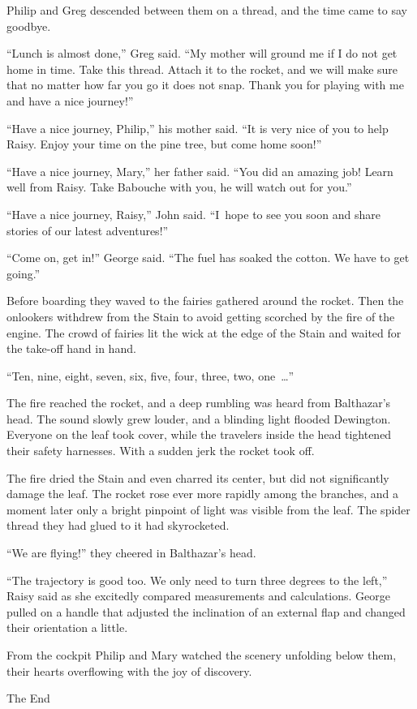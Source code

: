 \documentclass[10pt]{memoir}
\begin{document}
Philip and Greg descended between them on a thread, and the time came to say
goodbye.

``Lunch is almost done,'' Greg said. ``My mother will ground me if I do not get
home in time. Take this thread. Attach it to the rocket, and we will make sure
that no matter how far you go it does not snap. Thank you for playing with me
and have a nice journey!''

``Have a nice journey, Philip,'' his mother said. ``It is very nice of you to
help Raisy. Enjoy your time on the pine tree, but come home soon!''

``Have a nice journey, Mary,'' her father said. ``You did an amazing job! Learn
well from Raisy. Take Babouche with you, he will watch out for you.''

``Have a nice journey, Raisy,'' John said. ``I~hope to see you soon and share
stories of our latest adventures!''

``Come on, get in!'' George said. ``The fuel has soaked the cotton. We have to
get going.''

Before boarding they waved to the fairies gathered around the rocket. Then
the onlookers withdrew from the Stain to avoid getting scorched by the fire of
the engine. The crowd of fairies lit the wick at the edge of the Stain and
waited for the take-off hand in hand.

``Ten, nine, eight, seven, six, five, four, three, two, one~\dots''

The fire reached the rocket, and a deep rumbling was heard from Balthazar's
head. The sound slowly grew louder, and a blinding light flooded Dewington.
Everyone on the leaf took cover, while the travelers inside the head tightened
their safety harnesses. With a sudden jerk the rocket took off.

The fire dried the Stain and even charred its center, but did not significantly
damage the leaf. The rocket rose ever more rapidly among the branches, and a
moment later only a bright pinpoint of light was visible from the leaf. The
spider thread they had glued to it had skyrocketed.

``We are flying!'' they cheered in Balthazar's head.

``The trajectory is good too. We only need to turn three degrees to the left,''
Raisy said as she excitedly compared measurements and calculations. George
pulled on a handle that adjusted the inclination of an external flap and
changed their orientation a little.

From the cockpit Philip and Mary watched the scenery unfolding below them,
their hearts overflowing with the joy of discovery.

\begin{center}
The End
\end{center}

\cleartoverso
\cleartorecto
\end{document}
